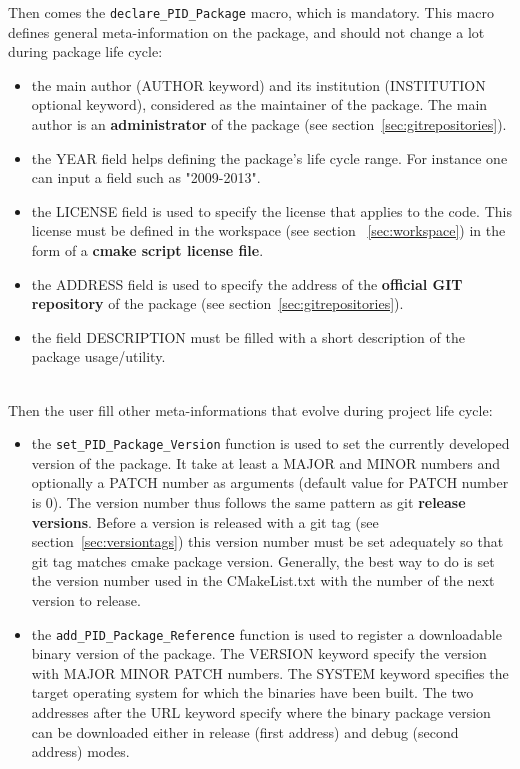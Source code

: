 \documentclass[12pt,a4paper]{article}
\begin{document}
Then comes the \texttt{declare\_PID\_Package} macro, which is mandatory. This macro defines general meta-information on the package, and should not change a lot during package life cycle: 
\begin{itemize}
\item the main author (AUTHOR keyword) and its institution (INSTITUTION optional keyword), considered as the maintainer of the package. The main author is an \textbf{administrator} of the package (see section~\ref{sec:gitrepositories}).
\item the YEAR field helps defining the package's life cycle range. For instance one can input a field such as "2009-2013".
\item the LICENSE field is used to specify the license that applies to the code. This license must be defined in the workspace (see section ~\ref{sec:workspace}) in the form of a \textbf{cmake script license file}.
\item the ADDRESS field is used to specify the address of the \textbf{official GIT repository} of the package (see section~\ref{sec:gitrepositories}).
\item the field DESCRIPTION must be filled with a short description of the package usage/utility.
\end{itemize}
~\\

Then the user fill other meta-informations that evolve during project life cycle:
\begin{itemize}
\item the \texttt{set\_PID\_Package\_Version} function is used to set the currently developed version of the package. It take at least a MAJOR and MINOR numbers and optionally a PATCH number as arguments (default value for PATCH number is 0). The version number thus follows the same pattern as git \textbf{release versions}. Before a version is released with a git tag (see section~\ref{sec:versiontags}) this version number must be set adequately so that git tag matches cmake package version. Generally, the best way to do is set the version number used in the CMakeList.txt with the number of the next version to release.
\item the \texttt{add\_PID\_Package\_Reference} function is used to register a downloadable binary version of the package. The VERSION keyword specify the version with MAJOR MINOR PATCH numbers. The SYSTEM keyword specifies the target operating system for which the binaries have been built. The two addresses after the URL keyword specify where the binary package version can be downloaded either in release (first address) and debug (second address) modes.
\end{itemize}
\end{document}
